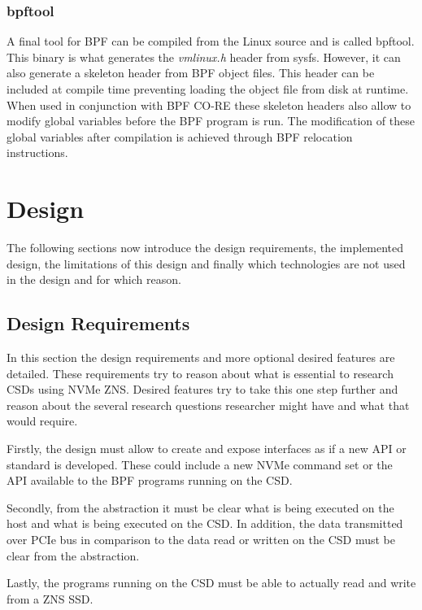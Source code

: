 \documentclass[conference]{IEEEtran}
\begin{document}
\twocolumn

\subsubsection{bpftool}

A final tool for BPF can be compiled from the Linux source and is called
bpftool. This binary is what generates the \textit{vmlinux.h} header from
sysfs. However, it can also generate a skeleton header from BPF object files.
This header can be included at compile time preventing loading the object file
from disk at runtime. When used in conjunction with BPF CO-RE these skeleton
headers also allow to modify global variables before the BPF program is run.
The modification of these global variables after compilation is achieved through
BPF relocation instructions.

\section{Design}

The following sections now introduce the design requirements, the implemented
design, the limitations of this design and finally which technologies are not
used in the design and for which reason.

\subsection{Design Requirements}

In this section the design requirements and more optional desired features are
detailed. These requirements try to reason about what is essential to research
CSDs using NVMe ZNS. Desired features try to take this one step further and
reason about the several research questions researcher might have and what that
would require.

Firstly, the design must allow to create and expose interfaces as if a new API
or standard is developed. These could include a new NVMe command set or the
API available to the BPF programs running on the CSD.

Secondly, from the abstraction it must be clear what is being executed on the
host and what is being executed on the CSD. In addition, the data transmitted
over PCIe bus in comparison to the data read or written on the CSD must be clear
from the abstraction.

Lastly, the programs running on the CSD must be able to actually read and write
from a ZNS SSD.
\end{document}
